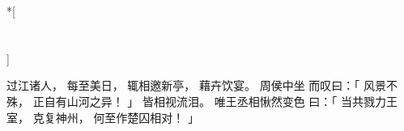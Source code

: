 
\switchcolumn[0]*[\section{}]

过江诸人，
每至美日，
辄相邀新亭，
藉卉饮宴。
周侯中坐
而叹曰：「
    风景不殊，
    正自有山河之异！
」
皆相视流泪。
唯王丞相愀然变色
曰：「
    当共戮力王室，
    克复神州，
    何至作楚囚相对！
」

\switchcolumn


